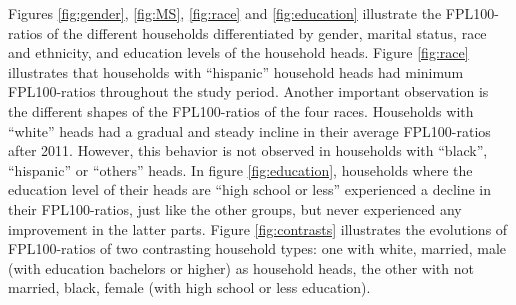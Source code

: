 \documentclass[11pt]{extarticle} %
\begin{document}
Figures \ref{fig:gender}, \ref{fig:MS}, \ref{fig:race} and \ref{fig:education} illustrate the FPL100-ratios of the different households differentiated by gender, marital status, race and ethnicity, and education levels of the household heads. Figure \ref{fig:race} illustrates that households with ``hispanic'' household heads had minimum FPL100-ratios throughout the study period. Another important observation is the different shapes of the FPL100-ratios of the four races. Households with ``white'' heads had a gradual and steady incline in their average FPL100-ratios after 2011. However, this behavior is not observed in households with ``black'', ``hispanic'' or ``others'' heads. In figure \ref{fig:education}, households where the education level of their heads are ``high school or less'' experienced a decline in their FPL100-ratios, just like the other groups, but never experienced any improvement in the latter parts. Figure \ref{fig:contrasts} illustrates the evolutions of FPL100-ratios of two contrasting household types: one with white, married, male (with education bachelors or higher) as household heads, the other with not married, black, female (with high school or less education). 
\end{document}
